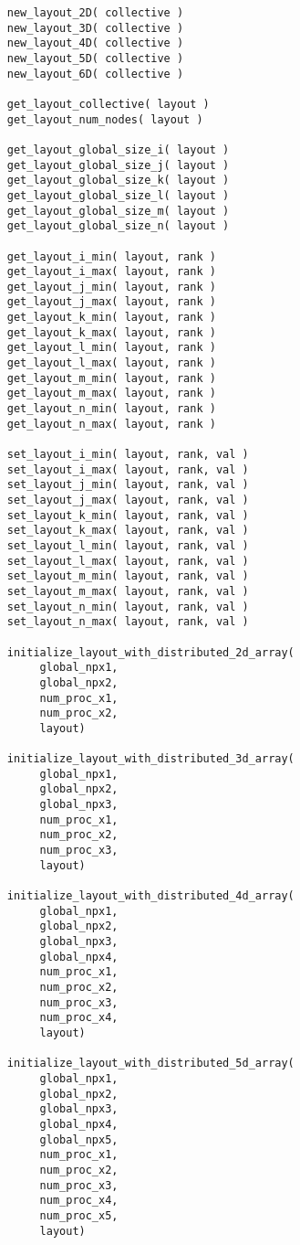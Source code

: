 \documentclass[]{report}   %
\begin{document}
\begin{verbatim}
     new_layout_2D( collective )
     new_layout_3D( collective )
     new_layout_4D( collective )
     new_layout_5D( collective )
     new_layout_6D( collective )
     
     get_layout_collective( layout )
     get_layout_num_nodes( layout )
     
     get_layout_global_size_i( layout )
     get_layout_global_size_j( layout )
     get_layout_global_size_k( layout )
     get_layout_global_size_l( layout )
     get_layout_global_size_m( layout )
     get_layout_global_size_n( layout )
     
     get_layout_i_min( layout, rank )
     get_layout_i_max( layout, rank )
     get_layout_j_min( layout, rank )
     get_layout_j_max( layout, rank )
     get_layout_k_min( layout, rank )
     get_layout_k_max( layout, rank )
     get_layout_l_min( layout, rank )
     get_layout_l_max( layout, rank )
     get_layout_m_min( layout, rank )
     get_layout_m_max( layout, rank )
     get_layout_n_min( layout, rank )
     get_layout_n_max( layout, rank )
     
     set_layout_i_min( layout, rank, val )
     set_layout_i_max( layout, rank, val )
     set_layout_j_min( layout, rank, val )
     set_layout_j_max( layout, rank, val )
     set_layout_k_min( layout, rank, val )
     set_layout_k_max( layout, rank, val )
     set_layout_l_min( layout, rank, val )
     set_layout_l_max( layout, rank, val )
     set_layout_m_min( layout, rank, val )
     set_layout_m_max( layout, rank, val )
     set_layout_n_min( layout, rank, val )
     set_layout_n_max( layout, rank, val )

     initialize_layout_with_distributed_2d_array( 
          global_npx1, 
          global_npx2, 
          num_proc_x1, 
          num_proc_x2, 
          layout)
          
     initialize_layout_with_distributed_3d_array( 
          global_npx1, 
          global_npx2, 
          global_npx3, 
          num_proc_x1, 
          num_proc_x2, 
          num_proc_x3, 
          layout)
          
     initialize_layout_with_distributed_4d_array( 
          global_npx1, 
          global_npx2, 
          global_npx3, 
          global_npx4, 
          num_proc_x1, 
          num_proc_x2, 
          num_proc_x3, 
          num_proc_x4, 
          layout)
          
     initialize_layout_with_distributed_5d_array( 
          global_npx1, 
          global_npx2, 
          global_npx3, 
          global_npx4, 
          global_npx5, 
          num_proc_x1, 
          num_proc_x2, 
          num_proc_x3, 
          num_proc_x4, 
          num_proc_x5, 
          layout)
          

\end{verbatim}
\end{document}
